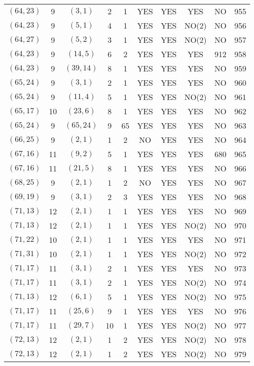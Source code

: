 \begin{longtable}{|c|c|c|c|c|c|c|c|c|c|}
$(64, 23)$ & 9 & $(3, 1)$ & 2 & 1 & YES & YES & YES & NO & 955\\
$(64, 23)$ & 9 & $(5, 1)$ & 4 & 1 & YES & YES & NO(2) & NO & 956\\
$(64, 27)$ & 9 & $(5, 2)$ & 3 & 1 & YES & YES & NO(2) & NO & 957\\
$(64, 23)$ & 9 & $(14, 5)$ & 6 & 2 & YES & YES & YES & 912 & 958\\
$(64, 23)$ & 9 & $(39, 14)$ & 8 & 1 & YES & YES & YES & NO & 959\\
$(65, 24)$ & 9 & $(3, 1)$ & 2 & 1 & YES & YES & YES & NO & 960\\
$(65, 24)$ & 9 & $(11, 4)$ & 5 & 1 & YES & YES & NO(2) & NO & 961\\
$(65, 17)$ & 10 & $(23, 6)$ & 8 & 1 & YES & YES & YES & NO & 962\\
$(65, 24)$ & 9 & $(65, 24)$ & 9 & 65 & YES & YES & YES & NO & 963\\
$(66, 25)$ & 9 & $(2, 1)$ & 1 & 2 & NO & YES & YES & NO & 964\\
$(67, 16)$ & 11 & $(9, 2)$ & 5 & 1 & YES & YES & YES & 680 & 965\\
$(67, 16)$ & 11 & $(21, 5)$ & 8 & 1 & YES & YES & YES & NO & 966\\
$(68, 25)$ & 9 & $(2, 1)$ & 1 & 2 & NO & YES & YES & NO & 967\\
$(69, 19)$ & 9 & $(3, 1)$ & 2 & 3 & YES & YES & YES & NO & 968\\
$(71, 13)$ & 12 & $(2, 1)$ & 1 & 1 & YES & YES & YES & NO & 969\\
$(71, 13)$ & 12 & $(2, 1)$ & 1 & 1 & YES & YES & NO(2) & NO & 970\\
$(71, 22)$ & 10 & $(2, 1)$ & 1 & 1 & YES & YES & YES & NO & 971\\
$(71, 31)$ & 10 & $(2, 1)$ & 1 & 1 & YES & YES & NO(2) & NO & 972\\
$(71, 17)$ & 11 & $(3, 1)$ & 2 & 1 & YES & YES & YES & NO & 973\\
$(71, 17)$ & 11 & $(3, 1)$ & 2 & 1 & YES & YES & NO(2) & NO & 974\\
$(71, 13)$ & 12 & $(6, 1)$ & 5 & 1 & YES & YES & NO(2) & NO & 975\\
$(71, 17)$ & 11 & $(25, 6)$ & 9 & 1 & YES & YES & YES & NO & 976\\
$(71, 17)$ & 11 & $(29, 7)$ & 10 & 1 & YES & YES & NO(2) & NO & 977\\
$(72, 13)$ & 12 & $(2, 1)$ & 1 & 2 & YES & YES & NO(2) & NO & 978\\
$(72, 13)$ & 12 & $(2, 1)$ & 1 & 2 & YES & YES & NO(2) & NO & 979\\

\end{longtable}
